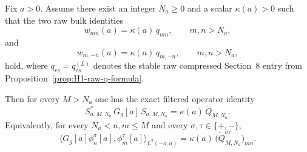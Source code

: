 \begin{theorem}\label{thm:H1-filtered-bulk}
Fix $a>0$. Assume there exist an integer $N_a\ge 0$ and a scalar
$\kappa(a)>0$ such that the two raw bulk identities
\begin{equation}\label{eq:H1-raw-bulk-plus-plus}
  w_{mn}(a)=\kappa(a)\,q_{mn},
  \qquad m,n>N_a,
\end{equation}
and
\begin{equation}\label{eq:H1-raw-bulk-plus-minus}
  w_{m,-n}(a)=\kappa(a)\,q_{m,-n},
  \qquad m,n>N_a,
\end{equation}
hold, where $q_{rs}=q_{rs}^{(L)}$ denotes the stable raw compressed Section~8
entry from Proposition~\ref{prop:H1-raw-q-formula}.

Then for every $M>N_a$ one has the exact filtered operator identity
\[
  S_{a,M,N_a}^*\,G_g[a] \,S_{a,M,N_a}
  =
  \kappa(a)\,\widetilde Q_{M,N_a}.
\]
Equivalently, for every $N_a<n,m\le M$ and every $\sigma,\tau\in\{+,-\}$,
\[
  \bigl\langle G_g[a]\phi_n^\sigma[a],\phi_m^\tau[a]\bigr\rangle_{L^2(-a,a)}
  =
  \kappa(a)\,\bigl(\widetilde Q_{M,N_a}^{\sigma\tau}\bigr)_{mn}.
\]
\end{theorem}

